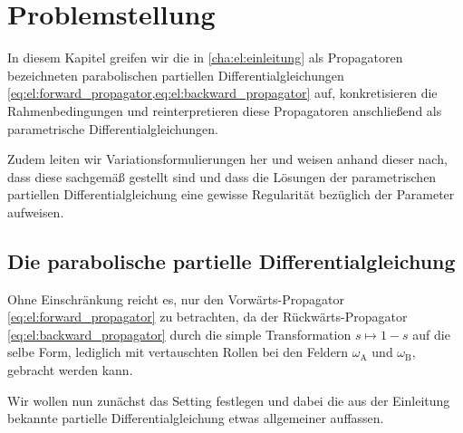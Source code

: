 
\iftoggle{dictum}{
    \setchapterpreamble[ul][0.6\textwidth]{%
        \dictum[Andy Weir, \textit{The Martian}]{\enquote{I guess you could call it a \enquote{failure}, but I prefer the term \enquote{learning
        experience}.}}
        \vspace*{2\baselineskip}
    }
}{}
\chapter{Problemstellung} %
\label{cha:ps:problemstellung}

In diesem Kapitel greifen wir die in \cref{cha:el:einleitung} als Propagatoren bezeichneten parabolischen partiellen Differentialgleichungen \cref{eq:el:forward_propagator,eq:el:backward_propagator} auf, konkretisieren die Rahmenbedingungen und reinterpretieren diese Propagatoren anschließend als parametrische Differentialgleichungen.

Zudem leiten wir Variationsformulierungen her und weisen anhand dieser nach, dass diese sachgemäß gestellt sind und dass die Lösungen der parametrischen partiellen Differentialgleichung eine gewisse Regularität bezüglich der Parameter aufweisen.


\section{Die parabolische partielle Differentialgleichung} %
\label{sec:ps:pde:die_parabolische_partielle_differentialgleichung}

Ohne Einschränkung reicht es, nur den Vorwärts-Propagator \cref{eq:el:forward_propagator} zu betrachten, da der Rückwärts-Propagator \cref{eq:el:backward_propagator} durch die simple Transformation $s \mapsto 1 - s$ auf die selbe Form, lediglich mit vertauschten Rollen bei den Feldern $\omega_{\mathrm{A}}$ und $\omega_{\mathrm{B}}$, gebracht werden kann.

Wir wollen nun zunächst das Setting festlegen und dabei die aus der Einleitung bekannte partielle Differentialgleichung etwas allgemeiner auffassen.

